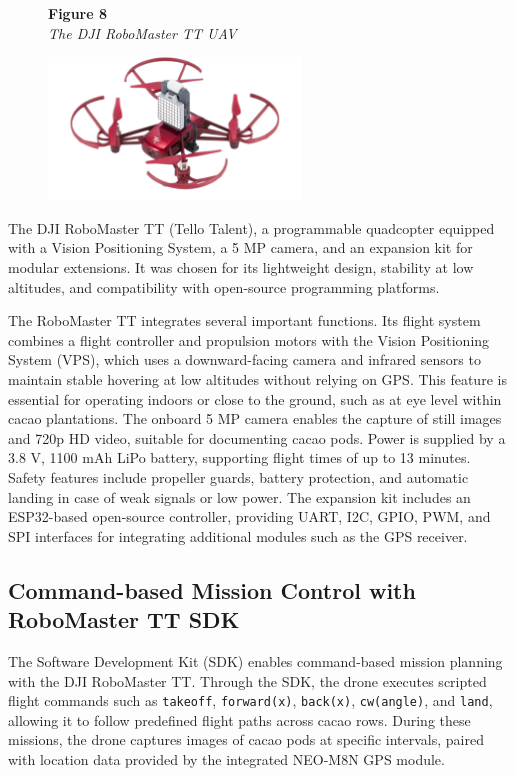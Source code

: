 \begin{figure}[H]
	\raggedright
	\textbf{Figure 8} \\ %
	\textit{The DJI RoboMaster TT UAV} %

	\vspace{0.5em}
	\centering
	\includegraphics[width=0.6\textwidth]{figures/Robomaster_TT.pdf} %

	\vspace{0.5em}
	\raggedright

	\label{fig:robomaster_tt}
\end{figure}

The DJI RoboMaster TT (Tello Talent), a programmable quadcopter
equipped with a Vision Positioning System, a 5 MP camera, and an expansion kit for modular extensions.
It was chosen for its lightweight design, stability at low altitudes, and compatibility with open-source
programming platforms.

The RoboMaster TT integrates several important functions. Its flight system combines a flight controller
and propulsion motors with the Vision Positioning System (VPS), which uses a downward-facing camera and
infrared sensors to maintain stable hovering at low altitudes without relying on GPS. This feature is
essential for operating indoors or close to the ground, such as at eye level within cacao plantations.
The onboard 5 MP camera enables the capture of still images and 720p HD video, suitable for documenting
cacao pods. Power is supplied by a 3.8 V, 1100 mAh LiPo battery, supporting flight times of up to
13 minutes. Safety features include propeller guards, battery protection, and automatic landing in case
of weak signals or low power. The expansion kit includes an ESP32-based open-source controller, providing
UART, I2C, GPIO, PWM, and SPI interfaces for integrating additional modules such as the GPS receiver.

\subsection{Command-based Mission Control with RoboMaster TT SDK}
The Software Development Kit (SDK) enables command-based mission planning with the
DJI RoboMaster TT. Through the SDK, the drone executes scripted flight commands such as
\texttt{takeoff}, \texttt{forward(x)}, \texttt{back(x)}, \texttt{cw(angle)}, and \texttt{land},
allowing it to follow predefined flight paths across cacao rows. During these missions, the drone
captures images of cacao pods at specific intervals, paired with location data provided by the
integrated NEO-M8N GPS module.

